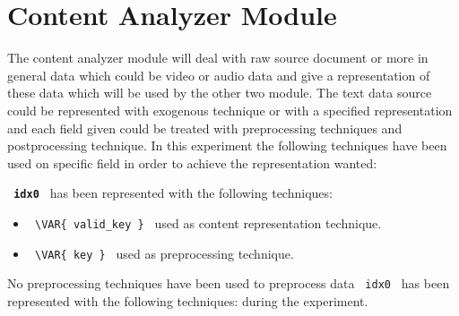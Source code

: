 \section{Content Analyzer Module}\label{sec:ca}
The content analyzer module will deal with raw source document or more in general data which could be
video or audio data and give a representation of these data which will be used by the other two module.
The text data source could be represented with exogenous technique or with a specified representation
and each field given could be treated with preprocessing techniques and postprocessing technique.
In this experiment the following techniques have been used on specific field in order to achieve the
representation wanted:
\hfill\break
\hfill\break



\textbf{\lstinline[style=verbatim-text]| idx0 |} has been represented with the following techniques:

\begin{itemize}

        \item
        \verb| \VAR{ valid_key } | used as content representation technique.
\end{itemize}




\begin{itemize}
    \item
     \verb| \VAR{ key } | used as preprocessing technique.
\end{itemize}
No preprocessing techniques have been used to preprocess data \lstinline[style=verbatim-text]| idx0 | has been represented with the following techniques:
 during the experiment.





